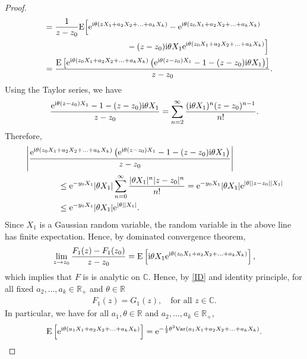 \documentclass[12pt, reqno]{amsart}
\newcommand{\C}{{\mathbb{C}}}
\newcommand{\R}{{\mathbb{R}}}
\newcommand{\E}{\mathrm{E}}
\newcommand{\<}{\langle}
\renewcommand{\>}{\rangle}
\newcommand{\e}{\mathrm{e}}
\newcommand{\Var}{\text{\rm Var}}
\begin{document}
\begin{appendix}
\begin{proof}
\begin{align*}
          &\quad
          = \frac{1}{z-z_0}
          \E\Big[ \e^{{\rm i}\theta (zX_1+a_2X_2+\ldots+a_kX_k)} - \e^{{\rm i}\theta (z_0X_1+a_2X_2+\ldots+a_kX_k)}  \\
          &\qquad\qquad\qquad\qquad\qquad\quad
          -(z-z_0) {\rm i}\theta X_1\e^{{\rm i} \theta(z_0X_1+a_2X_2+\ldots +a_kX_k)}
          \Big]\\
          &\quad=  \frac{\E\left[ \e^{{\rm i}\theta (z_0X_1+a_2X_2+\ldots+a_kX_k)}  \left( \e^{{\rm i}\theta (z-z_0)X_1} -1
          -(z-z_0)  {\rm i} \theta X_1\right)
          \right]}{z-z_0}.
          \end{align*}
          Using the Taylor series, we have
          \begin{align*}
            \frac{ \e^{{\rm i}\theta (z-z_0)X_1} -1
          -(z-z_0)  {\rm i}  \theta X_1}{z-z_0}= \sum_{n=2}^\infty \frac{( {\rm i}  \theta X_1)^n(z-z_0)^{n-1}}{n!}.          
          \end{align*}
          Therefore, 
          \begin{align*}
          &\left|  \frac{ \e^{{\rm i}\theta (z_0X_1+a_2X_2+\ldots+a_kX_k)}  \left( \e^{{\rm i}\theta (z-z_0)X_1} -1
          -(z-z_0)  {\rm i}  \theta X_1\right)
          }{z-z_0}  \right|\\
          &\qquad\qquad \leq \e^{-y_0X_1}|\theta X_1| \sum_{n=0}^\infty \frac{|\theta X_1|^n|z-z_0|^{n}}{n!}
          =  \e^{-y_0X_1}|\theta X_1| \e^{|\theta| |z-z_0||X_1|}\\
          &\qquad\qquad \leq \e^{-y_0X_1}|\theta X_1| \e^{|\theta||X_1|}.
          \end{align*}
          Since $X_1$ is a Gaussian random variable, the random variable in the above line has finite expectation. Hence, by dominated
          convergence theorem, 
          \begin{align*}
          \lim_{z\to z_0}\frac{F_1(z)-F_1(z_0)}{z-z_0} = \E\left[  {\rm i}  \theta X_1\e^{ {\rm i}  \theta(z_0X_1+a_2X_2+\ldots+a_kX_k)} \right],
          \end{align*}
          which implies that $F$ is is analytic on $\C$. Hence, by \eqref{ID} and identity principle,  for all fixed $a_2, \ldots, a_k \in \R_+$ and $\theta\in \R$
          \begin{align*}
          F_1(z)= G_1(z), \quad \text{for all $z\in \C$}.
          \end{align*}
          In particular, we have for all $a_1, \theta\in \R$ and $a_2, \ldots, a_k\in \R_+$,
          \begin{align*}
           \E\left[\e^{{\rm i}\theta (a_1X_1+a_2X_2+\ldots +a_kX_k)}\right] = \e^{-\frac12\theta^2\Var(a_1X_1+a_2X_2+\ldots+a_kX_k)}.
          \end{align*}
          

\end{proof}
\end{appendix}
\end{document}

